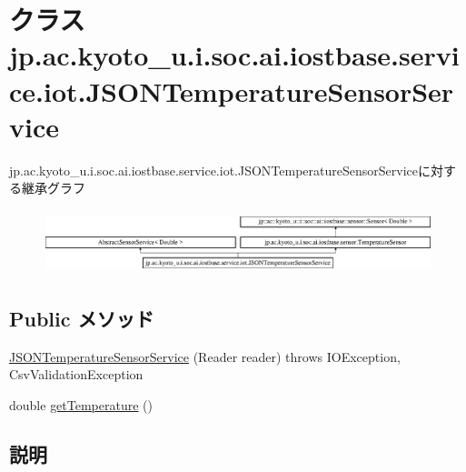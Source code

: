 \hypertarget{classjp_1_1ac_1_1kyoto__u_1_1i_1_1soc_1_1ai_1_1iostbase_1_1service_1_1iot_1_1_j_s_o_n_temperature_sensor_service}{\section{クラス jp.\-ac.\-kyoto\-\_\-u.\-i.\-soc.\-ai.\-iostbase.\-service.\-iot.\-J\-S\-O\-N\-Temperature\-Sensor\-Service}
\label{classjp_1_1ac_1_1kyoto__u_1_1i_1_1soc_1_1ai_1_1iostbase_1_1service_1_1iot_1_1_j_s_o_n_temperature_sensor_service}
}
jp.\-ac.\-kyoto\-\_\-u.\-i.\-soc.\-ai.\-iostbase.\-service.\-iot.\-J\-S\-O\-N\-Temperature\-Sensor\-Serviceに対する継承グラフ\begin{figure}[H]
\begin{center}
\leavevmode
\includegraphics[height=1.879195cm]{classjp_1_1ac_1_1kyoto__u_1_1i_1_1soc_1_1ai_1_1iostbase_1_1service_1_1iot_1_1_j_s_o_n_temperature_sensor_service}
\end{center}
\end{figure}
\subsection*{Public メソッド}
\begin{DoxyCompactItemize}
\item 
\hyperlink{classjp_1_1ac_1_1kyoto__u_1_1i_1_1soc_1_1ai_1_1iostbase_1_1service_1_1iot_1_1_j_s_o_n_temperature_sensor_service_aa68ee7e80ea73d8818959b268cd7491a}{J\-S\-O\-N\-Temperature\-Sensor\-Service} (Reader reader)  throws I\-O\-Exception, Csv\-Validation\-Exception 
\item 
double \hyperlink{classjp_1_1ac_1_1kyoto__u_1_1i_1_1soc_1_1ai_1_1iostbase_1_1service_1_1iot_1_1_j_s_o_n_temperature_sensor_service_a65f9d03fbf35ea8a280d8bf67810cc4e}{get\-Temperature} ()
\end{DoxyCompactItemize}


\subsection{説明}


